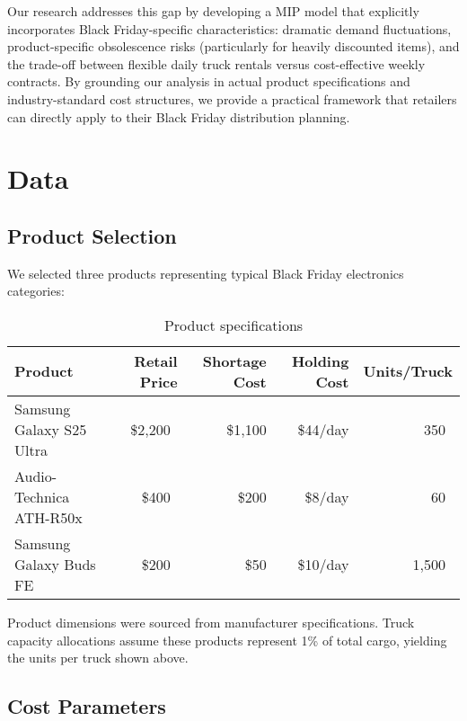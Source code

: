 \documentclass[a4paper,12pt]{article}
\begin{document}
Our research addresses this gap by developing a MIP model that explicitly incorporates Black Friday-specific characteristics: dramatic demand fluctuations, product-specific obsolescence risks (particularly for heavily discounted items), and the trade-off between flexible daily truck rentals versus cost-effective weekly contracts.
By grounding our analysis in actual product specifications and industry-standard cost structures, we provide a practical framework that retailers can directly apply to their Black Friday distribution planning.




\section{Data}\label{sec:data}

\subsection{Product Selection}\label{subsec:product-selection}
We selected three products representing typical Black Friday electronics categories:

\begin{table}[h]
\centering
\caption{Product specifications}
\begin{tabular}{lrrrr}
\toprule
Product & Retail Price & Shortage Cost & Holding Cost & Units/Truck \\
\midrule
Samsung Galaxy S25 Ultra & \$2,200~\cite{phonecost} & \$1,100 & \$44/day & 350~\cite{phonespecs} \\
Audio-Technica ATH-R50x & \$400~\cite{headphonescost} & \$200 & \$8/day & 60~\cite{headphonesspecs} \\
Samsung Galaxy Buds FE & \$200~\cite{earphonescost} & \$50 & \$10/day & 1,500~\cite{earphonesspecs} \\
\bottomrule
\end{tabular}\label{tab:table}
\end{table}

Product dimensions were sourced from manufacturer specifications.
Truck capacity allocations assume these products represent 1\% of total cargo, yielding the units per truck shown above.

\subsection{Cost Parameters}\label{subsec:cost-parameters}
\end{document}
